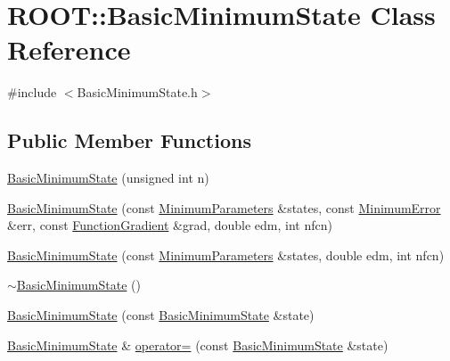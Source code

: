 \hypertarget{classROOT_1_1Minuit2_1_1BasicMinimumState}{}\section{R\+O\+OT\+:\+:Basic\+Minimum\+State Class Reference}
\label{classROOT_1_1Minuit2_1_1BasicMinimumState}


{\ttfamily \#include $<$Basic\+Minimum\+State.\+h$>$}

\subsection*{Public Member Functions}
\begin{DoxyCompactItemize}
\item 
\mbox{\hyperlink{classROOT_1_1Minuit2_1_1BasicMinimumState_a5442cd6f54e10c1a7e888d013393fbf6}{Basic\+Minimum\+State}} (unsigned int n)
\item 
\mbox{\hyperlink{classROOT_1_1Minuit2_1_1BasicMinimumState_af7498cdda17a96e7a93dbd22862a73cc}{Basic\+Minimum\+State}} (const \mbox{\hyperlink{classROOT_1_1Minuit2_1_1MinimumParameters}{Minimum\+Parameters}} \&states, const \mbox{\hyperlink{classROOT_1_1Minuit2_1_1MinimumError}{Minimum\+Error}} \&err, const \mbox{\hyperlink{classROOT_1_1Minuit2_1_1FunctionGradient}{Function\+Gradient}} \&grad, double edm, int nfcn)
\item 
\mbox{\hyperlink{classROOT_1_1Minuit2_1_1BasicMinimumState_ac01b76fd4f72db80c4e86766c51a5f44}{Basic\+Minimum\+State}} (const \mbox{\hyperlink{classROOT_1_1Minuit2_1_1MinimumParameters}{Minimum\+Parameters}} \&states, double edm, int nfcn)
\item 
\mbox{\hyperlink{classROOT_1_1Minuit2_1_1BasicMinimumState_ae9724fa5e9d8a2f5403ac0a131bfbe91}{$\sim$\+Basic\+Minimum\+State}} ()
\item 
\mbox{\hyperlink{classROOT_1_1Minuit2_1_1BasicMinimumState_af76fc4a4cc111099fd188e145fa82b5c}{Basic\+Minimum\+State}} (const \mbox{\hyperlink{classROOT_1_1Minuit2_1_1BasicMinimumState}{Basic\+Minimum\+State}} \&state)
\item 
\mbox{\hyperlink{classROOT_1_1Minuit2_1_1BasicMinimumState}{Basic\+Minimum\+State}} \& \mbox{\hyperlink{classROOT_1_1Minuit2_1_1BasicMinimumState_a68cf1c28f5f728fa62a0c39ff943a2bf}{operator=}} (const \mbox{\hyperlink{classROOT_1_1Minuit2_1_1BasicMinimumState}{Basic\+Minimum\+State}} \&state)
\item 

\end{DoxyCompactItemize}
